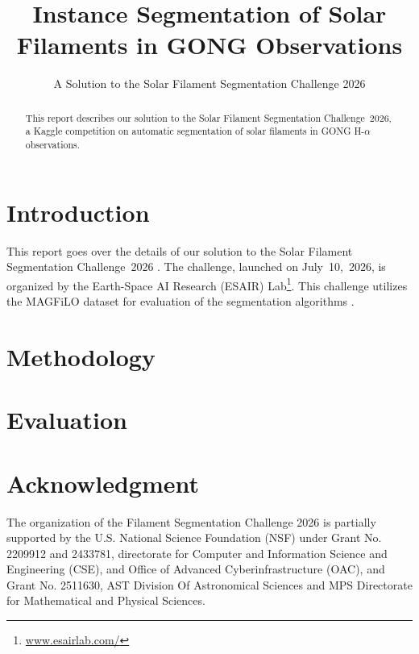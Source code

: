 \documentclass[sigconf]{acmart}
\begin{document}
\title{Instance Segmentation of Solar Filaments in GONG Observations}
\subtitle{A Solution to the Solar Filament Segmentation Challenge 2026}
\begin{abstract}
This report describes our solution to the Solar Filament Segmentation Challenge~2026, a Kaggle competition on automatic segmentation of solar filaments in GONG H-$\alpha$ observations. 
\end{abstract}
\maketitle

\section{Introduction}
This report goes over the details of our solution to the Solar Filament Segmentation Challenge~2026 \cite{filament-segmentation-2026}. The challenge, launched on July~10,~2026, is organized by the Earth-Space AI Research (ESAIR) Lab\footnote{\href{https://www.esairlab.com/home}{www.esairlab.com/}}. This challenge utilizes the MAGFiLO dataset for evaluation of the segmentation algorithms \cite{ahmadzadeh2024dataset}.


\section{Methodology}\label{sec:methodology}


\section{Evaluation}\label{sec:evaluation}



\section{Acknowledgment}\label{sec:acknowledgment}
The organization of the Filament Segmentation Challenge 2026 is partially supported by the U.S. National Science Foundation (NSF) under Grant No. 2209912 and 2433781, directorate for Computer and Information Science and Engineering (CSE), and Office of Advanced Cyberinfrastructure (OAC), and Grant No. 2511630, AST Division Of Astronomical Sciences and MPS Directorate for Mathematical and Physical Sciences.
\end{document}
